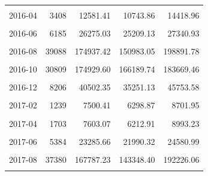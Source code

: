 \begin{longtable}[t]{crrrr}
\cellcolor{gray!10}{2016-03} & \cellcolor{gray!10}{3425} & \cellcolor{gray!10}{13566.59} & \cellcolor{gray!10}{12326.15} & \cellcolor{gray!10}{14807.03}\\
2016-04 & 3408 & 12581.41 & 10743.86 & 14418.96\\
\cellcolor{gray!10}{2016-05} & \cellcolor{gray!10}{3287} & \cellcolor{gray!10}{13768.19} & \cellcolor{gray!10}{12594.09} & \cellcolor{gray!10}{14942.29}\\
2016-06 & 6185 & 26275.03 & 25209.13 & 27340.93\\
\cellcolor{gray!10}{2016-07} & \cellcolor{gray!10}{19242} & \cellcolor{gray!10}{66092.02} & \cellcolor{gray!10}{51471.90} & \cellcolor{gray!10}{80712.13}\\
2016-08 & 39088 & 174937.42 & 150983.05 & 198891.78\\
\cellcolor{gray!10}{2016-09} & \cellcolor{gray!10}{42209} & \cellcolor{gray!10}{220993.33} & \cellcolor{gray!10}{204529.02} & \cellcolor{gray!10}{237457.65}\\
2016-10 & 30809 & 174929.60 & 166189.74 & 183669.46\\
\cellcolor{gray!10}{2016-11} & \cellcolor{gray!10}{19160} & \cellcolor{gray!10}{91606.19} & \cellcolor{gray!10}{81984.49} & \cellcolor{gray!10}{101227.89}\\
2016-12 & 8206 & 40502.35 & 35251.13 & 45753.58\\
\cellcolor{gray!10}{2017-01} & \cellcolor{gray!10}{2253} & \cellcolor{gray!10}{12611.35} & \cellcolor{gray!10}{9423.30} & \cellcolor{gray!10}{15799.40}\\
2017-02 & 1239 & 7500.41 & 6298.87 & 8701.95\\
\cellcolor{gray!10}{2017-03} & \cellcolor{gray!10}{1920} & \cellcolor{gray!10}{8519.94} & \cellcolor{gray!10}{7075.88} & \cellcolor{gray!10}{9964.01}\\
2017-04 & 1703 & 7603.07 & 6212.91 & 8993.23\\
\cellcolor{gray!10}{2017-05} & \cellcolor{gray!10}{2571} & \cellcolor{gray!10}{11352.41} & \cellcolor{gray!10}{9844.45} & \cellcolor{gray!10}{12860.37}\\
2017-06 & 5384 & 23285.66 & 21990.32 & 24580.99\\
\cellcolor{gray!10}{2017-07} & \cellcolor{gray!10}{17568} & \cellcolor{gray!10}{63056.66} & \cellcolor{gray!10}{51259.00} & \cellcolor{gray!10}{74854.31}\\
2017-08 & 37380 & 167787.23 & 143348.40 & 192226.06\\
\cellcolor{gray!10}{2017-09} & \cellcolor{gray!10}{72895} & \cellcolor{gray!10}{355180.46} & \cellcolor{gray!10}{333854.76} & \cellcolor{gray!10}{376506.16}\\

\end{longtable}
